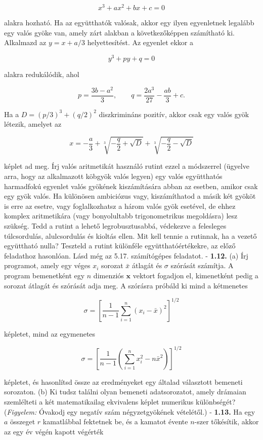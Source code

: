 \documentclass[
  magyar,
  11pt]{article}
\providecommand{\boldsymbol}[1]{\mathbf{#1}}
\begin{document}
\[x^3 + ax^2 + bx + c = 0\]

alakra hozható. Ha az együtthatók valósak, akkor egy ilyen egyenletnek
legalább egy valós gyöke van, amely zárt alakban a következőképpen
számítható ki. Alkalmazd az \(y = x + a/3\) helyettesítést. Az egyenlet
ekkor a

\[y^3 + py + q = 0\]

alakra redukálódik, ahol

\[p = \frac{3b - a^2}{3}, \qquad q = \frac{2a^3}{27} - \frac{ab}{3} + c.\]

Ha a \(D = (p/3)^3 + (q/2)^2\) diszkrimináns pozitív, akkor csak egy
valós gyök létezik, amelyet az

\[x = -\frac{a}{3} + \sqrt[3]{-\frac{q}{2} + \sqrt{D}} + \sqrt[3]{-\frac{q}{2} - \sqrt{D}}\]

képlet ad meg. Írj valós aritmetikát használó rutint ezzel a módszerrel
(ügyelve arra, hogy az alkalmazott köbgyök valós legyen) egy valós
együtthatós harmadfokú egyenlet valós gyökének kiszámítására abban az
esetben, amikor csak egy gyök valós. Ha különösen ambiciózus vagy,
kiszámíthatod a másik két gyököt is erre az esetre, vagy foglalkozhatsz
a három valós gyök esetével, de ehhez komplex aritmetikára (vagy
bonyolultabb trigonometrikus megoldásra) lesz szükség. Tedd a rutint a
lehető legrobusztusabbá, védekezve a felesleges túlcsordulás,
alulcsordulás és kioltás ellen. Mit kell tennie a rutinnak, ha a vezető
együttható nulla? Teszteld a rutint különféle együtthatóértékekre, az
előző feladathoz hasonlóan. Lásd még az 5.17. számítógépes feladatot. -
\textbf{1.12.} (a) Írj programot, amely egy véges \(x_i\) sorozat
\(\bar{x}\) átlagát és \(\sigma\) szórását számítja. A program
bemenetként egy \(n\) dimenziós \(\boldsymbol{x}\) vektort fogadjon el,
kimenetként pedig a sorozat átlagát és szórását adja meg. A szórásra
próbáld ki mind a kétmenetes

\[\sigma = \left[\frac{1}{n-1} \sum_{i=1}^{n} (x_i - \bar{x})^2\right]^{1/2}\]

képletet, mind az egymenetes

\[\sigma = \left[\frac{1}{n-1} \left(\sum_{i=1}^{n} x_i^2 - n\bar{x}^2\right)\right]^{1/2}\]

képletet, és hasonlítsd össze az eredményeket egy általad választott
bemeneti sorozaton. (b) Ki tudsz találni olyan bemeneti adatsorozatot,
amely drámaian szemlélteti a két matematikailag ekvivalens képlet
numerikus különbségét? (\emph{Figyelem:} Óvakodj egy negatív szám
négyzetgyökének vételétől.) - \textbf{1.13.} Ha egy \(a\) összeget \(r\)
kamatlábbal fektetnek be, és a kamatot évente \(n\)-szer tőkésítik,
akkor az egy év végén kapott végérték
\end{document}
